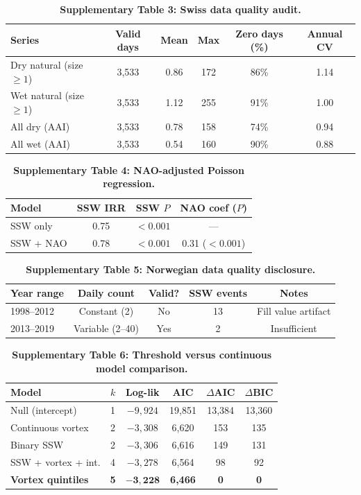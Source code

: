 \documentclass[11pt,letterpaper]{article}
\begin{document}
\begin{table}[!ht]
\centering
\caption{\textbf{Supplementary Table 3: Swiss data quality audit.}}
\label{stab:quality}
\small
\begin{tabular}{lccccc}
\toprule
Series & Valid days & Mean & Max & Zero days (\%) & Annual CV \\
\midrule
Dry natural (size $\geq 1$) & 3,533 & 0.86 & 172 & 86\% & 1.14 \\
Wet natural (size $\geq 1$) & 3,533 & 1.12 & 255 & 91\% & 1.00 \\
All dry (AAI) & 3,533 & 0.78 & 158 & 74\% & 0.94 \\
All wet (AAI) & 3,533 & 0.54 & 160 & 90\% & 0.88 \\
\bottomrule
\end{tabular}
\end{table}

\begin{table}[!ht]
\centering
\caption{\textbf{Supplementary Table 4: NAO-adjusted Poisson regression.}}
\label{stab:nao}
\small
\begin{tabular}{lccc}
\toprule
Model & SSW IRR & SSW $P$ & NAO coef ($P$) \\
\midrule
SSW only & 0.75 & $< 0.001$ & --- \\
SSW + NAO & 0.78 & $< 0.001$ & 0.31 ($< 0.001$) \\
\bottomrule
\end{tabular}
\end{table}

\begin{table}[!ht]
\centering
\caption{\textbf{Supplementary Table 5: Norwegian data quality disclosure.}}
\label{stab:norway_quality}
\small
\begin{tabular}{lcccc}
\toprule
Year range & Daily count & Valid? & SSW events & Notes \\
\midrule
1998--2012 & Constant (2) & No & 13 & Fill value artifact \\
2013--2019 & Variable (2--40) & Yes & 2 & Insufficient \\
\bottomrule
\end{tabular}
\end{table}

\begin{table}[!ht]
\centering
\caption{\textbf{Supplementary Table 6: Threshold versus continuous model comparison.}}
\label{stab:model}
\small
\begin{tabular}{lccccc}
\toprule
Model & $k$ & Log-lik & AIC & $\Delta$AIC & $\Delta$BIC \\
\midrule
Null (intercept) & 1 & $-9{,}924$ & 19,851 & 13,384 & 13,360 \\
Continuous vortex & 2 & $-3{,}308$ & 6,620 & 153 & 135 \\
Binary SSW & 2 & $-3{,}306$ & 6,616 & 149 & 131 \\
SSW + vortex + int. & 4 & $-3{,}278$ & 6,564 & 98 & 92 \\
\textbf{Vortex quintiles} & \textbf{5} & $\mathbf{-3{,}228}$ & \textbf{6,466} & \textbf{0} & \textbf{0} \\
\bottomrule
\end{tabular}
\end{table}
\end{document}
